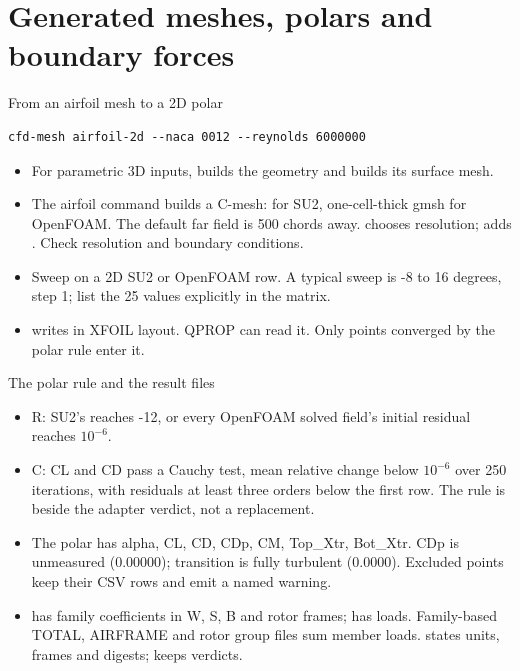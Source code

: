 \section{Generated meshes, polars and boundary forces}

\begin{frame}[fragile]{From an airfoil mesh to a 2D polar}
\begin{lstlisting}
cfd-mesh airfoil-2d --naca 0012 --reynolds 6000000
\end{lstlisting}
\begin{itemize}\small
  \item For parametric 3D inputs,  builds the
        geometry and  builds its surface mesh.
  \item The airfoil command builds a C-mesh:  for SU2, one-cell-thick
        gmsh  for OpenFOAM. The default far field is 500 chords away.
         chooses resolution; 
        adds . Check resolution and boundary conditions.
  \item Sweep  on a 2D SU2 or OpenFOAM row. A typical sweep is
        -8 to 16 degrees, step 1; list the 25 values explicitly in the matrix.
  \item {} writes  in XFOIL layout.
        QPROP can read it. Only points converged by the polar rule enter it.
\end{itemize}
\end{frame}

\begin{frame}{The polar rule and the result files}
\begin{itemize}\small
  \item R: SU2's  reaches -12, or every OpenFOAM solved field's
        initial residual reaches $10^{-6}$.
  \item C: CL and CD pass a Cauchy test, mean relative change below $10^{-6}$
        over 250 iterations, with residuals at least three orders below the
        first row. The rule is beside the adapter verdict, not a replacement.
  \item The polar has alpha, CL, CD, CDp, CM, Top_Xtr, Bot_Xtr. CDp is
        unmeasured (0.00000); transition is fully turbulent (0.0000).
        Excluded points keep their CSV rows and emit a named warning.
  \item {} has family coefficients in W, S, B and
        rotor frames;  has loads. Family-based TOTAL, AIRFRAME
        and rotor group files sum member loads.  states
        units, frames and digests;  keeps verdicts.
\end{itemize}
\end{frame}

